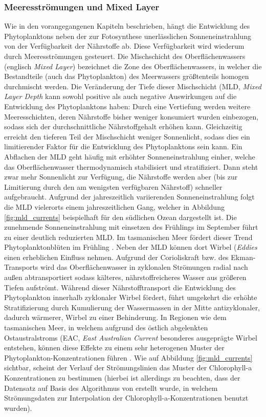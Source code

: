 \documentclass[12pt,a4paper,onecolumn]{scrartcl}
\begin{document}
\subsubsection{Meeresströmungen und Mixed Layer}
Wie in den vorangegangenen Kapiteln beschrieben, hängt die Entwicklung des Phytoplanktons neben der zur Fotosynthese unerlässlichen Sonneneinstrahlung von der Verfügbarkeit der Nährstoffe ab. Diese Verfügbarkeit wird wiederum durch Meeresströmungen gesteuert. Die Mischschicht des Oberflächenwassers (englisch \textit{Mixed Layer}) bezeichnet die Zone des Oberflächenwassers, in welcher die Bestandteile (auch das Phytoplankton) des Meerwassers größtenteils homogen durchmischt werden. Die Veränderung der Tiefe dieser Mischschicht (MLD, \textit{Mixed Layer Depth} kann sowohl positive als auch negative Auswirkungen auf die Entwicklung des Phytoplanktons haben: Durch eine Vertiefung werden weitere Meeresschichten, deren Nährstoffe bisher weniger konsumiert wurden einbezogen, sodass sich der durchschnittliche Nährstoffgehalt erhöhen kann. Gleichzeitig erreicht den tieferen Teil der Mischschicht weniger Sonnenlicht, sodass dies ein limitierender Faktor für die Entwicklung des Phytoplanktons sein kann. Ein Abflachen der MLD geht häufig mit erhöhter Sonneneinstrahlung einher, welche das Oberflächenwasser thermodynamisch stabilisiert und stratifiziert. Dann steht zwar mehr Sonnenlicht zur Verfügung, die Nährstoffe werden aber (bis zur Limitierung durch den am wenigsten verfügbaren Nährstoff) schneller aufgebraucht. Aufgrund der jahreszeitlich variierenden Sonneneinstrahlung folgt die MLD vielerorts einem jahreszeitlichen Gang, welcher in Abbildung \ref{fig:mld_currents} beispielhaft für den südlichen Ozean dargestellt ist. Die zunehmende Sonneneinstrahlung mit einsetzen des Frühlings im September führt zu einer deutlich reduzierten MLD. Im tasmanischen Meer fördert dieser Trend Phytoplanktonblüten im Frühling \citep{Tilburg.2002}. Neben der MLD können dort Wirbel (\textit{Eddies} einen erheblichen Einfluss nehmen. Aufgrund der Corioliskraft bzw. des Ekman-Transports wird das Oberflächenwasser in zyklonalen Strömungen radial nach außen abtransportiert sodass kälteres, nährstoffreicheres Wasser aus größeren Tiefen aufströmt. Während dieser Nährstofftransport die Entwicklung des Phytoplankton innerhalb zyklonaler Wirbel fördert, führt umgekehrt die erhöhte Stratifizierung durch Kumulierung der Wassermassen in der Mitte antizyklonaler, dadurch wärmerer, Wirbel zu einer Behinderung. In Regionen wie dem tasmanischen Meer, in welchem aufgrund des östlich abgelenkten Ostaustralstroms (EAC, \textit{East Australian Current} besonderes ausgeprägte Wirbel entstehen, können diese Effekte zu einem sehr heterogenen Muster der Phytoplankton-Konzentrationen führen \citep{Tilburg.2002}. Wie auf Abbildung \ref{fig:mld_currents} sichtbar, scheint der Verlauf der Strömungslinien das Muster der Chlorophyll-a Konzentrationen zu bestimmen (hierbei ist allerdings zu beachten, dass der Datensatz auf Basis des Algorithmus von \citet{Saulquin.2019} erstellt wurde, in welchem Strömungsdaten zur Interpolation der Chlorophyll-a-Konzentrationen benutzt wurden).
\end{document}

